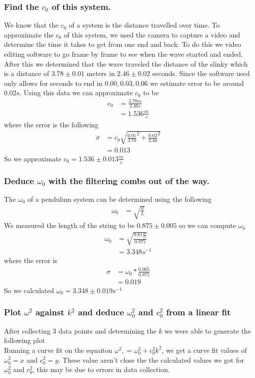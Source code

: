 \documentclass{article}
\begin{document}
\subsubsection*{Find the $c_0$ of this system.}
We know that the $c_0$ of a system is the distance travelled over time. To
approximate the $c_0$ of this system, we used the camera to capture a video
and determine the time it takes to get from one end and back. To do this we
video editing software to go frame by frame to see when the wave started and
ended. After this we determined that the wave traveled the distance of the
slinky which is a distance of $3.78 \pm 0.01$ meters in $2.46 \pm 0.02$ seconds.
Since the software used only allows for seconds to end in $0.00,0.03, 0.06$ we
estimate error to be around $0.02s$. Using this data we can approximate $c_0$
to be
\begin{align*}
    c_0 &= \frac{3.78m}{2.46s}\\
    &= 1.536 \frac{m}{s}
\end{align*}
where the error is the following
\begin{align*}
    \sigma &= c_0 \sqrt{\frac{0.01}{3.78}^2 + \frac{0.02}{2.46}^2}\\
    &= 0.013
\end{align*}
So we approximate $c_0 = 1.536 \pm 0.013 \frac{m}{s}$

\subsubsection*{Deduce $\omega_0$ with the filtering combs out of the way.}
The $\omega_0$ of a pendulum system can be determined using the following
\begin{align*}
    \omega_0 &= \sqrt{\frac{g}{L}}
\end{align*}
We measured the length of the string to be $0.875 \pm 0.005$ so we can compute
$\omega_0$
\begin{align*}
    \omega_0 &= \sqrt{\frac{9.81\frac{m}{s^2}}{0.875}}\\
    &= 3.348 s^{-1}
\end{align*}
where the error is 
\begin{align*}
    \sigma &= \omega_0 * \frac{0.005}{0.875}\\
    &= 0.019
\end{align*}
So we calculated $\omega_0 = 3.348 \pm 0.019 s^{-1}$ 


\newpage
\subsubsection*{Plot $\omega^2$ against $k^2$ and deduce $\omega_0^2$ and $c^2_0$
from a linear fit}
After collecting 3 data points and determining the $k$ we were able to generate
the following plot\\
Running a curve fit on the equaiton $\omega^2, = \omega_0^2 + c_0^2k^2$, we get
a curve fit values of $\omega_0^2 = x$ and $c_0^2 = y$. These value aren't close
the the calculated values we got for $\omega_0^2$ and $c_0^2$, this may be due
to errors in data collection.
\end{document}
